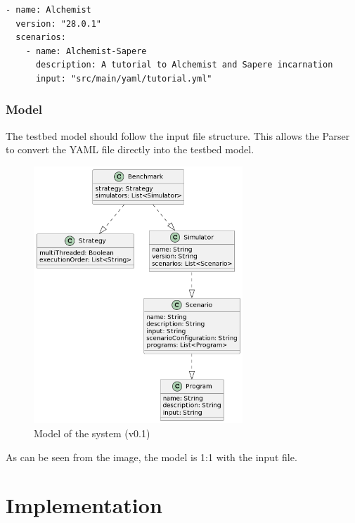 \documentclass[12pt,a4paper,openright,twoside]{book}
\begin{document}
\begin{lstlisting}[style=yaml, caption={One scenario and one program. Both specified in the same input file.}]
- name: Alchemist
  version: "28.0.1"
  scenarios:
    - name: Alchemist-Sapere
      description: A tutorial to Alchemist and Sapere incarnation
      input: "src/main/yaml/tutorial.yml"
\end{lstlisting}

\subsection{Model}
The testbed model should follow the input file structure. 
This allows the Parser to convert the YAML file directly into the testbed model.

\begin{figure}[h]
  \centering
  \includegraphics[width=0.7\textwidth]{figures/model.png}
  \caption{Model of the system (v0.1)}
  \label{fig:model}
\end{figure}

As can be seen from the image, the model is 1:1 with the input file.

\chapter{Implementation}
\end{document}
